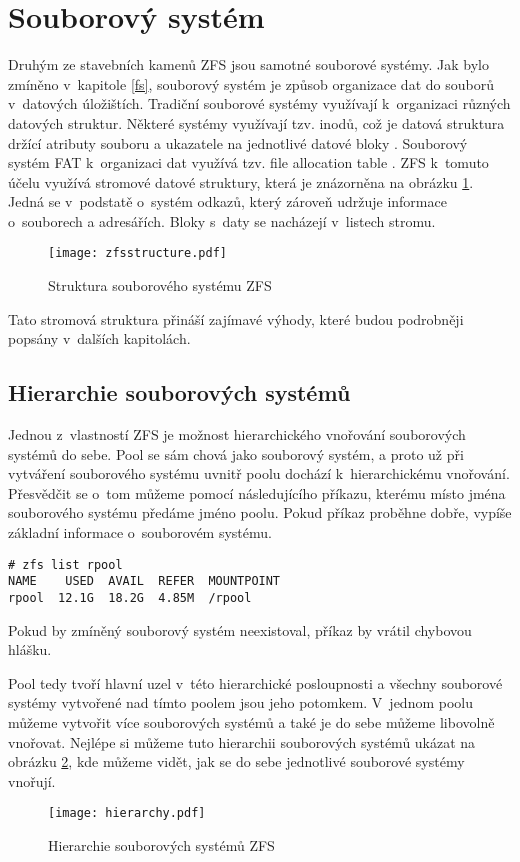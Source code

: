 \section{Souborový systém}
Druhým ze stavebních kamenů ZFS jsou samotné souborové systémy. Jak bylo zmíněno v~kapitole \ref{fs}, souborový systém je způsob organizace dat do souborů v~datových úložištích.
Tradiční souborové systémy využívají k~organizaci různých datových struktur. Některé systémy využívají tzv. inodů, což je datová struktura držící atributy souboru a ukazatele na jednotlivé datové bloky \cite{fs}. Souborový systém FAT k~organizaci dat využívá tzv. file allocation table \cite{fs}. ZFS k~tomuto účelu využívá stromové datové struktury, která je znázorněna na obrázku \ref{structure}. Jedná se v~podstatě o~systém odkazů, který zároveň udržuje informace o~souborech a adresářích. Bloky s~daty se nacházejí v~listech stromu.
\begin{figure}
    \centering
    \texttt{[image: zfsstructure.pdf]}
    \caption{Struktura souborového systému ZFS}
    \label{structure}
\end{figure}

Tato stromová struktura přináší zajímavé výhody, které budou podrobněji popsány v~dalších kapitolách.

\subsection{Hierarchie souborových systémů}
\label{hiararchy}
Jednou z~vlastností ZFS je možnost hierarchického vnořování souborových systémů do sebe. Pool se sám chová jako souborový systém, a proto už při vytváření souborového systému uvnitř poolu dochází k~hierarchickému vnořování. Přesvědčit se o~tom můžeme pomocí následujícího příkazu, kterému místo jména souborového systému předáme jméno poolu. Pokud příkaz proběhne dobře, vypíše základní informace o~souborovém systému.
\begin{verbatim}
# zfs list rpool
NAME    USED  AVAIL  REFER  MOUNTPOINT
rpool  12.1G  18.2G  4.85M  /rpool
\end{verbatim}
Pokud by zmíněný souborový systém neexistoval, příkaz by vrátil chybovou hlášku.

Pool tedy tvoří hlavní uzel v~této hierarchické posloupnosti a všechny souborové systémy vytvořené nad tímto poolem jsou jeho potomkem. V~jednom poolu můžeme vytvořit více souborových systémů a také je do sebe můžeme libovolně vnořovat. Nejlépe si můžeme tuto hierarchii souborových systémů ukázat na obrázku \ref{fshierarchy}, kde můžeme vidět, jak se do sebe jednotlivé souborové systémy vnořují.
\begin{figure}[b]
    \centering
    \texttt{[image: hierarchy.pdf]}
    \caption{Hierarchie souborových systémů ZFS}
    \label{fshierarchy}
\end{figure}

